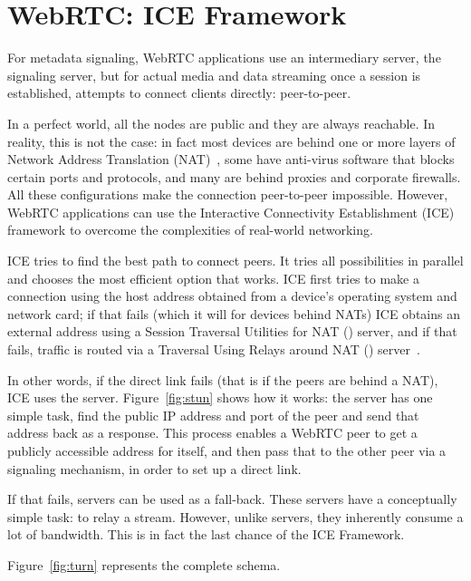 \section{WebRTC: ICE Framework}
\label{sec:webrtc_ice}
For metadata signaling, WebRTC applications use an intermediary server, the signaling server, but for actual media and data streaming once a session is established, \RTCPeerConnection attempts to connect clients directly: peer-to-peer. 

In a perfect world, all the nodes are public and they are always reachable. In reality, this is not the case: in fact most devices are behind one or more layers of Network Address Translation (NAT)~\cite{nat}, some have anti-virus software that blocks certain ports and protocols, and many are behind proxies and corporate firewalls. All these configurations make the connection peer-to-peer impossible. However, WebRTC applications can use the Interactive Connectivity Establishment (ICE) framework to overcome the complexities of real-world networking. 

ICE tries to find the best path to connect peers. It tries all possibilities in parallel and chooses the most efficient option that works. ICE first tries to make a connection using the host address obtained from a device's operating system and network card; if that fails (which it will for devices behind NATs) ICE obtains an external address using a Session Traversal Utilities for NAT (\STUN) server, and if that fails, traffic is routed via a Traversal Using Relays around NAT (\TURN) server~\cite{webrtc_infrastructure}. 

In other words, if the direct link fails (that is if the peers are behind a NAT), ICE uses the \STUN server. Figure~\ref{fig:stun} shows how it works: the server has one simple task, find the public IP address and port of the peer and send that address back as a response.  This process enables a WebRTC peer to get a publicly accessible address for itself, and then pass that to the other peer via a signaling mechanism, in order to set up a direct link.

If that fails, \TURN servers can be used as a fall-back. These servers have a conceptually simple task: to relay a stream. However, unlike \STUN servers, they inherently consume a lot of bandwidth. This is in fact the last chance of the ICE Framework.

Figure~\ref{fig:turn} represents the complete schema.

